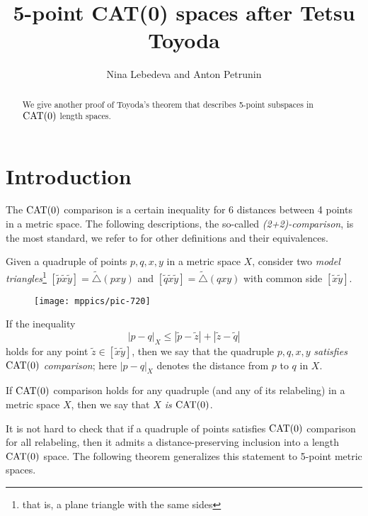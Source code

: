 \documentclass{article}
\begin{document}


\title{5-point CAT(0) spaces after Tetsu Toyoda}
\author{Nina Lebedeva and Anton Petrunin}
\date{}
\maketitle
\begin{abstract}
We give another proof of Toyoda's theorem that describes 5-point subspaces in $\mathrm{CAT}(0)$ length spaces.
\end{abstract}

\section{Introduction}

The $\mathrm{CAT}(0)$ comparison is a certain inequality for 6 distances between 4 points in a metric space.
The following descriptions, the so-called \emph{(2+2)-comparison}, is the most standard,
we refer to \cite{alexander-kapovitch-petrunin-2019,alexander-kapovitch-petrunin-2021} for other definitions and their equivalences.

Given a quadruple of points $p,q,x,y$ in a metric space $X$,
consider two \emph{model triangles}\footnote{that is, a plane triangle with the same sides}
$[\tilde p\tilde x\tilde y]=\tilde\triangle(pxy)$ 
and 
$[\tilde q\tilde x\tilde y]=\tilde\triangle(qxy)$ with common side $[\tilde x\tilde y]$.

\begin{wrapfigure}{r}{25mm}
\vskip-4mm
\centering
\texttt{[image: mppics/pic-720]}
\end{wrapfigure}

If the inequality
\[|p-q|_X\le |\tilde p-\tilde z|+|\tilde z-\tilde q|\]
holds for any point $\tilde z\in [\tilde x\tilde y]$, then we say that 
the quadruple $p,q,x,y$ \emph{satisfies $\mathrm{CAT}(0)$ comparison};
here $|p-q|_X$ denotes the distance from $p$ to $q$ in $X$.

If $\mathrm{CAT}(0)$ comparison holds for any quadruple (and any of its relabeling) in a metric space $X$,
then we say that \emph{$X$ is $\mathrm{CAT}(0)$}.


It is not hard to check that if a quadruple of points satisfies $\mathrm{CAT}(0)$ comparison for all relabeling,
then it admits a distance-preserving inclusion into a length $\mathrm{CAT}(0)$ space.
The following theorem generalizes this statement to 5-point metric spaces.
\end{document}
